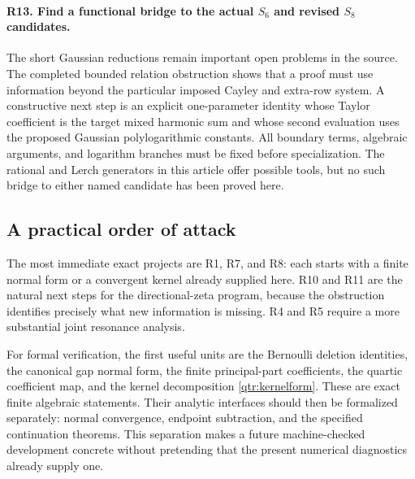 \paragraph{R13. Find a functional bridge to the actual \(S_6\) and revised \(S_8\) candidates.}
The short Gaussian reductions remain important open
problems in the source. The completed bounded relation
obstruction shows that a proof must use information
beyond the particular imposed Cayley and extra-row
system. A constructive next step is an explicit
one-parameter identity whose Taylor coefficient is the
target mixed harmonic sum and whose second evaluation
uses the proposed Gaussian polylogarithmic constants.
All boundary terms, algebraic arguments, and logarithm
branches must be fixed before specialization. The
rational and Lerch generators in this article offer
possible tools, but no such bridge to either named
candidate has been proved here.

\subsection{A practical order of attack}

The most immediate exact projects are R1, R7, and R8:
each starts with a finite normal form or a convergent
kernel already supplied here. R10 and R11 are the
natural next steps for the directional-zeta program,
because the obstruction identifies precisely what
new information is missing. R4 and R5 require a more
substantial joint resonance analysis.

For formal verification, the first useful units are
the Bernoulli deletion identities, the canonical gap
normal form, the finite principal-part coefficients,
the quartic coefficient map, and the kernel decomposition
\eqref{qtr:kernelform}. These are exact finite algebraic
statements. Their analytic interfaces should then
be formalized separately: normal convergence,
endpoint subtraction, and the specified continuation
theorems. This separation makes a future machine-checked
development concrete without pretending that the
present numerical diagnostics already supply one.
